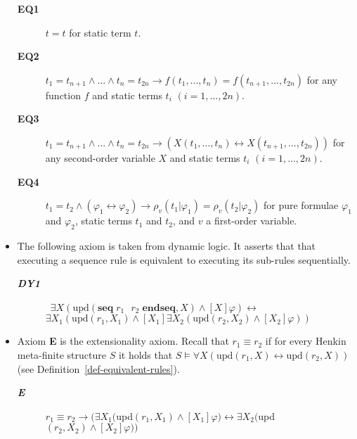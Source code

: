 \documentclass[preprint,11pt]{elsarticle}
\theoremstyle{definition}
\theoremstyle{remark}
\begin{document}
\begin{itemize}
\begin{description}
\item[\textbf{EQ1}] $t=t$ for static term $t$. \smallskip

\item[\textbf{EQ2}] $t_1=t_{n+1}\wedge...\wedge t_n=t_{2n}\rightarrow f(t_1,...,t_n) = f(t_{n+1},...,t_{2n})$ for any
function $f$ and static terms $t_i$ $(i=1,...,2n)$.\smallskip

\item[\textbf{EQ3}] $t_1=t_{n+1}\wedge...\wedge t_n=t_{2n}\rightarrow (X(t_1,...,t_n) \leftrightarrow X(t_{n+1},...,t_{2n}))$ for any second-order variable $X$ and static terms $t_i$ $(i=1,...,2n)$.\smallskip

\item[\textbf{EQ4}] $t_1=t_2\wedge(\varphi_1 \leftrightarrow \varphi_2)\rightarrow \rho_{v}(t_1|\varphi_1)=\rho_{v}(t_2|\varphi_2)$ for pure formulae $\varphi_1$ and $\varphi_2$, static terms $t_1$ and $t_2$, and $v$ a first-order variable. \smallskip

\end{description}

\smallskip

\item The following axiom is taken from dynamic logic. It asserts that that executing a sequence rule is equivalent to executing its sub-rules sequentially.

\begin{description}

\item[\textbf{\emph{DY1}}] \ $\exists X (\text{upd}(\textbf{seq}\; r_1\text{ }r_2 \;\textbf{endseq}, X) \wedge [X]\varphi) \leftrightarrow$\\
\hspace*{4.4cm} $\exists X_1 (\text{upd}(r_1,X_1) \wedge [X_1]\exists X_2(\text{upd}(r_2,X_2) \wedge [X_2] \varphi))$
\end{description}

\item Axiom \textbf{E} is the extensionality axiom. Recall that $r_1\equiv r_2$ if for every Henkin meta-finite structure $S$ it holds that $S \models \forall X (\mathrm{upd}(r_1,X)\leftrightarrow \mathrm{upd}(r_2,X))$ (see Definition~\ref{def-equivalent-rules}).

\begin{description}
 \item[\textbf{\emph{E}}] $r_1\equiv r_2\rightarrow (\exists X_1 ($upd$(r_1,X_1)\wedge [X_1]\varphi)\leftrightarrow \exists X_2 ($upd$(r_2,X_2)\wedge [X_2]\varphi))$

\end{description}
\smallskip
\end{itemize}
\end{document}
